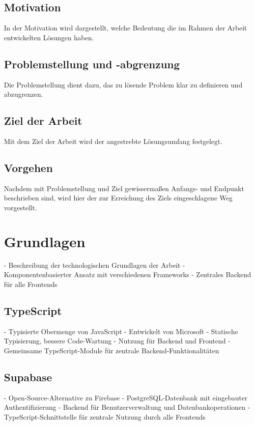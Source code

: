 \documentclass[oneside]{ausarbeitung}
\begin{document}
\section{Motivation}
\label{sec:motivation}

In der Motivation wird dargestellt, welche Bedeutung die im Rahmen der Arbeit entwickelten Lösungen haben.

\section{Problemstellung und -abgrenzung}
\label{sec:problemstellung}

Die Problemstellung dient dazu, das zu lösende Problem klar zu definieren und abzugrenzen. 

\section{Ziel der Arbeit}
\label{sec:ziel}

Mit dem Ziel der Arbeit wird der angestrebte Lösungsumfang festgelegt.

\section{Vorgehen}
\label{sec:vorgehen}

Nachdem mit Problemstellung und Ziel gewissermaßen Anfangs- und Endpunkt beschrieben sind, wird hier der zur Erreichung des Ziels eingeschlagene Weg vorgestellt.

\chapter{Grundlagen}
\label{chap:grundlagen}

- Beschreibung der technologischen Grundlagen der Arbeit  
- Komponentenbasierter Ansatz mit verschiedenen Frameworks  
- Zentrales Backend für alle Frontends  

\section{TypeScript}
- Typisierte Obermenge von JavaScript  
- Entwickelt von Microsoft  
- Statische Typisierung, bessere Code-Wartung  
- Nutzung für Backend und Frontend  
- Gemeinsame TypeScript-Module für zentrale Backend-Funktionalitäten  

\section{Supabase}
- Open-Source-Alternative zu Firebase  
- PostgreSQL-Datenbank mit eingebauter Authentifizierung  
- Backend für Benutzerverwaltung und Datenbankoperationen  
- TypeScript-Schnittstelle für zentrale Nutzung durch alle Frontends  
\end{document}
